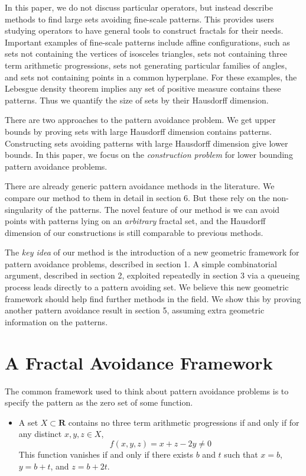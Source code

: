 \documentclass{article}
\theoremstyle{plain}
\theoremstyle{plain}
\begin{document}
\begin{multicols}{2}
In this paper, we do not discuss particular operators, but instead describe methods to find large sets avoiding fine-scale patterns. This provides users studying operators to have general tools to construct fractals for their needs. Important examples of fine-scale patterns include affine configurations, such as sets not containing the vertices of isosceles triangles, sets not containing three term arithmetic progressions, sets not generating particular families of angles, and sets not containing points in a common hyperplane. For these examples, the Lebesgue density theorem implies any set of positive measure contains these patterns. Thus we quantify the size of sets by their Hausdorff dimension.

There are two approaches to the pattern avoidance problem. We get upper bounds by proving sets with large Hausdorff dimension contains patterns. Constructing sets avoiding patterns with large Hausdorff dimension give lower bounds. In this paper, we focus on the {\it construction problem} for lower bounding pattern avoidance problems.

There are already generic pattern avoidance methods in the literature. We compare our method to them in detail in section 6. But these rely on the non-singularity of the patterns. The novel feature of our method is we can avoid points with patterns lying on an {\it arbitrary} fractal set, and the Hausdorff dimension of our constructions is still comparable to previous methods.

The {\it key idea} of our method is the introduction of a new geometric framework for pattern avoidance problems, described in section 1. A simple combinatorial argument, described in section 2, exploited repeatedly in section 3 via a queueing process leads directly to a pattern avoiding set. We believe this new geometric framework should help find further methods in the field. We show this by proving another pattern avoidance result in section 5, assuming extra geometric information on the patterns.

\section{A Fractal Avoidance Framework}

The common framework used to think about pattern avoidance problems is to specify the pattern as the zero set of some function.
%
\begin{itemize}
	\item A set $X \subset \mathbf{R}$ contains no three term arithmetic progressions if and only if for any distinct $x,y,z \in X$,
	\[ f(x,y,z) = x + z - 2y \neq 0  \]
	This function vanishes if and only if there exists $b$ and $t$ such that $x = b$, $y = b+t$, and $z = b+2t$.


\end{itemize}
\end{multicols}
\end{document}
